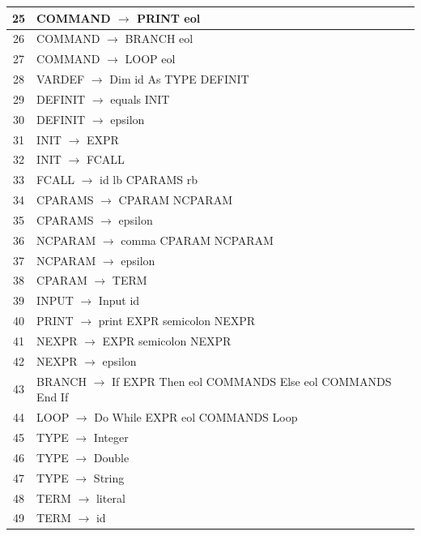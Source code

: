 \documentclass[11pt, a4paper]{article}
\begin{document}
\begin{center}
\begin{tabular}{ c | l }
        25 & COMMAND     $\rightarrow$ PRINT eol \\ \hline
        26 & COMMAND     $\rightarrow$ BRANCH eol \\ \hline
        27 & COMMAND     $\rightarrow$ LOOP eol \\ \hline
        28 & VARDEF      $\rightarrow$ Dim id As TYPE DEFINIT \\ \hline
        29 & DEFINIT     $\rightarrow$ equals INIT \\ \hline
        30 & DEFINIT     $\rightarrow$  epsilon \\ \hline
        31 & INIT        $\rightarrow$ EXPR \\ \hline
        32 & INIT        $\rightarrow$ FCALL \\ \hline
        33 & FCALL       $\rightarrow$ id lb CPARAMS rb \\ \hline
        34 & CPARAMS     $\rightarrow$ CPARAM NCPARAM \\ \hline
        35 & CPARAMS     $\rightarrow$ epsilon \\ \hline
        36 & NCPARAM     $\rightarrow$ comma CPARAM NCPARAM \\ \hline
        37 & NCPARAM     $\rightarrow$ epsilon  \\ \hline
        38 & CPARAM      $\rightarrow$ TERM \\ \hline
        39 & INPUT       $\rightarrow$ Input id \\ \hline
        40 & PRINT       $\rightarrow$ print EXPR semicolon NEXPR \\ \hline
        41 & NEXPR       $\rightarrow$ EXPR semicolon NEXPR \\ \hline
        42 & NEXPR       $\rightarrow$ epsilon \\ \hline
        43 & BRANCH      $\rightarrow$ If EXPR Then eol COMMANDS Else eol COMMANDS End If \\ \hline
        44 & LOOP        $\rightarrow$ Do While EXPR eol COMMANDS Loop \\ \hline
        45 & TYPE        $\rightarrow$ Integer \\ \hline
        46 & TYPE        $\rightarrow$ Double \\ \hline
        47 & TYPE        $\rightarrow$ String \\ \hline
        48 & TERM        $\rightarrow$ literal \\ \hline
        49 & TERM        $\rightarrow$ id \\
    \end{tabular}
\end{center}
\end{document}
